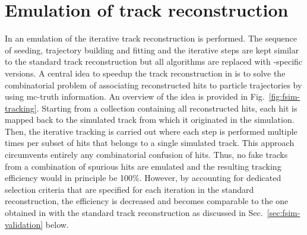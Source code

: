 \section{Emulation of track reconstruction}
\label{sec:fsim-tracking}

In \FSIM an emulation of the iterative track reconstruction is performed. The sequence of seeding, trajectory building and fitting and the iterative steps are kept similar to the standard track reconstruction but all algorithms are replaced with \FSIM-specific versions. A central idea to speedup the track reconstruction in \FSIM is to solve the combinatorial problem of associating reconstructed hits to particle trajectories by using \gls{mc}-truth information. An overview of the idea is provided in Fig.~\ref{fig:fsim-tracking}. Starting from a collection containing all reconstructed hits, each hit is mapped back to the simulated track from which it originated in the simulation. Then, the iterative tracking is carried out where each step is performed multiple times per subset of hits that belongs to a single simulated track. This approach circumvents entirely any combinatorial confusion of hits. Thus, no fake tracks from a combination of spurious hits are emulated and the resulting tracking efficiency would in principle be 100\%. However, by accounting for dedicated selection criteria that are specified for each iteration in the standard reconstruction, the efficiency is decreased and becomes comparable to the one obtained in with the standard track reconstruction as discussed in Sec.~\ref{sec:fsim-validation} below.


